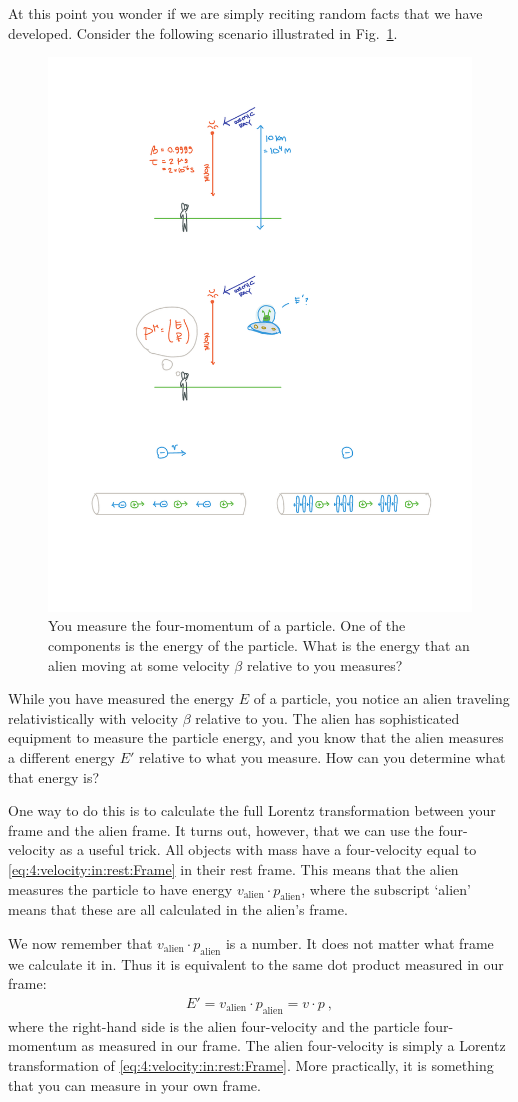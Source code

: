 \documentclass[12pt, oneside]{report}    %
\begin{document}
At this point you wonder if we are simply reciting random facts that we have developed. Consider the following scenario illustrated in Fig.~\ref{fig:alien}.
% 
\begin{figure}[tb]
    \centering
    \includegraphics[width=.5\textwidth]{figures/alien.pdf}
    \caption{You measure the four-momentum of a particle. One of the components is the energy of the particle. What is the energy that an alien moving at some velocity $\beta$ relative to you measures?}
    \label{fig:alien}
\end{figure}
% 
While you have measured the energy $E$ of a particle, you notice an alien traveling relativistically with velocity $\beta$ relative to you. The alien has sophisticated equipment to measure the particle energy, and you know that the alien measures a different energy $E'$ relative to what you measure. How can you determine what that energy is?

One way to do this is to calculate the full Lorentz transformation between your frame and the alien frame. It turns out, however, that we can use the four-velocity as a useful trick. All objects with mass have a four-velocity equal to \eqref{eq:4:velocity:in:rest:Frame} in their rest frame. This means that the alien measures the particle to have energy $v_\text{alien}\cdot p_\text{alien}$, where the subscript `alien' means that these are all calculated in the alien's frame.

We now remember that $v_\text{alien}\cdot p_\text{alien}$ is a number. It does not matter what frame we calculate it in. Thus it is equivalent to the same dot product measured in our frame:
\begin{align}
E'=
    v_\text{alien}\cdot p_\text{alien} = v\cdot p \ ,
\end{align}
where the right-hand side is the alien four-velocity and the particle four-momentum as measured in our frame. The alien four-velocity is simply a Lorentz transformation of \eqref{eq:4:velocity:in:rest:Frame}. More practically, it is something that you can measure in your own frame. 
\end{document}
